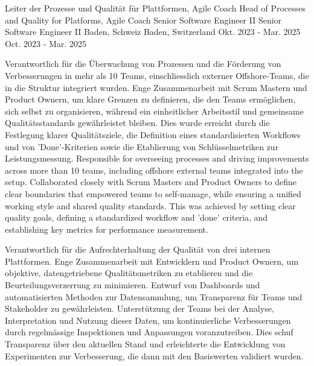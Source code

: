 \begin{cventries}
	\cventry
	{
			{ Leiter der Prozesse und Qualität für Plattformen, Agile Coach }
			{ Head of Processes and Quality for Platforms, Agile Coach }
	} %
	{
			{ Senior Software Engineer II }
			{ Senior Software Engineer II }
	} %
	{
		{ Baden, Schweiz }
		{ Baden, Switzerland }
	} %
	{
			{Okt. 2023 - Mar. 2025}
			{Oct. 2023 - Mar. 2025}
	} %
	{
		\begin{cvitems}
			\item {
				{
					Verantwortlich für die Überwachung von Prozessen und die Förderung von Verbesserungen in mehr als 10 Teams, einschliesslich externer Offshore-Teams, die in die Struktur integriert wurden. Enge Zusammenarbeit mit Scrum Mastern und Product Ownern, um klare Grenzen zu definieren, die den Teams ermöglichen, sich selbst zu organisieren, während ein einheitlicher Arbeitsstil und gemeinsame Qualitätsstandards gewährleistet bleiben. Dies wurde erreicht durch die Festlegung klarer Qualitätsziele, die Definition eines standardisierten Workflows und von 'Done'-Kriterien sowie die Etablierung von Schlüsselmetriken zur Leistungsmessung.
				}
				{
					Responsible for overseeing processes and driving improvements across more than 10 teams, including offshore external teams integrated into the setup. Collaborated closely with Scrum Masters and Product Owners to define clear boundaries that empowered teams to self-manage, while ensuring a unified working style and shared quality standards. This was achieved by setting clear quality goals, defining a standardized workflow and 'done' criteria, and establishing key metrics for performance measurement.
				}
			}			
			\item {
				{
					Verantwortlich für die Aufrechterhaltung der Qualität von drei internen Plattformen. Enge Zusammenarbeit mit Entwicklern und Product Ownern, um objektive, datengetriebene Qualitätsmetriken zu etablieren und die Beurteilungsverzerrung zu minimieren. Entwurf von Dashboards und automatisierten Methoden zur Datensammlung, um Transparenz für Teams und Stakeholder zu gewährleisten. Unterstützung der Teams bei der Analyse, Interpretation und Nutzung dieser Daten, um kontinuierliche Verbesserungen durch regelmässige Inspektionen und Anpassungen voranzutreiben. Dies schuf Transparenz über den aktuellen Stand und erleichterte die Entwicklung von Experimenten zur Verbesserung, die dann mit den Basiswerten validiert wurden.
}}
\end{cvitems}}
\end{cventries}
